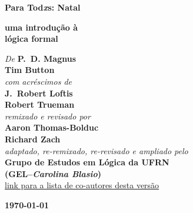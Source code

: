 

\pagestyle{empty}

\vspace*{80pt}

\begin{raggedleft}
\fontsize{30pt}{24pt}\sffamily
\selectfont
  \textbf{Para Tod{\fontsize{37pt}{24pt}\selectfont\rmfamily\textit{x}}s:
  Natal}

\medskip\fontsize{18pt}{20pt}\selectfont

\textbf{uma introdução à\\ lógica formal}





\vfill
\fontsize{12pt}{16pt}\selectfont \textit{De } \textbf{P.~D. Magnus}\\
\textbf{Tim Button}\\
\textit{com acréscimos de}\\
\textbf{J.~Robert Loftis}\\
\textbf{Robert Trueman}\\
\textit{remixado e revisado por}\\
\textbf{Aaron Thomas-Bolduc}\\ \textbf{Richard Zach}\\
\textit{adaptado, re-remixado, re-revisado e ampliado  pelo}\\ \textbf{Grupo de Estudos em Lógica da UFRN \\ (GEL--\textit{Carolina Blasio})}\\
\href{https://gelogica.weebly.com/para-todxs-natal.html}{{\small link para a lista de co-autores desta versão}}

\vfill
\textbf{\today}\par
\end{raggedleft}


\newpage

\thispagestyle{empty}
\onecolumn
\ 
\vfill

